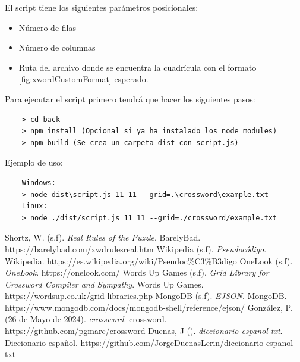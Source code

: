 \documentclass[12pt, a4paper]{article}
\begin{document}
El script tiene los siguientes parámetros posicionales:

\begin{itemize}
	\item Número de filas
	\item Número de columnas
	\item Ruta del archivo donde se encuentra la cuadrícula con el formato
	\ref{fig:xwordCustomFormat} esperado.
\end{itemize}

Para ejecutar el script primero tendrá que hacer los siguientes pasos:

\begin{verbatim}
	> cd back
	> npm install (Opcional si ya ha instalado los node_modules)
	> npm build (Se crea un carpeta dist con script.js)
\end{verbatim}

Ejemplo de uso:

\begin{verbatim}
	Windows:
	> node dist\script.js 11 11 --grid=.\crossword\example.txt
	Linux:
	> node ./dist/script.js 11 11 --grid=./crossword/example.txt
\end{verbatim}

\begin{thebibliography}{100}
	 Shortz, W. (s.f). \textit{Real Rules of the Puzzle}.
	BarelyBad. https://barelybad.com/xwdrulesreal.htm
	 Wikipedia (s.f). \textit{Pseudocódigo}. Wikipedia. https://es.wikipedia.org/wiki/Pseudoc\%C3\%B3digo
	 OneLook (s.f). \textit{OneLook}. https://onelook.com/
	 Words Up Games (s.f). \textit{Grid Library for Crossword 
	Compiler and Sympathy}. Words Up Games. https://wordsup.co.uk/grid-libraries.php
	 MongoDB (s.f). \textit{EJSON}. MongoDB. https://www.mongodb.com/docs/mongodb-shell/reference/ejson/
	 González, P. (26 de Mayo de 2024). \textit{crossword}. crossword.
	https://github.com/pgmarc/crossword
	 Duenas, J (). \textit{diccionario-espanol-txt}. Diccionario español.
	https://github.com/JorgeDuenasLerin/diccionario-espanol-txt
\end{thebibliography}
\end{document}

